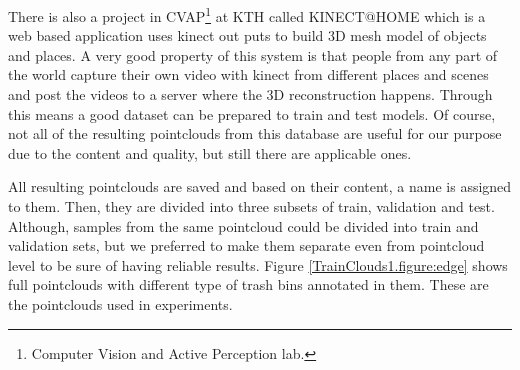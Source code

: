 There is also a project in CVAP\footnote{Computer Vision and Active Perception lab.} at KTH called KINECT@HOME \cite{aydemir2012kinect} which is a web based application uses
kinect out puts to build 3D mesh model of objects and places. 
A very good property of this system is that people from any part of the world capture their own video with kinect from different 
places and scenes and post the videos to a server where the 3D reconstruction happens. 
Through this means a good dataset can be prepared to train and test models.
Of course, not all of the resulting pointclouds from this database are useful for our purpose due to the content and
quality, but still there are applicable ones.


All resulting pointclouds are saved and based on their content, a name is assigned to them. 
Then, they are divided into three subsets of train, validation and test. 
Although, samples from the same pointcloud could be divided into train and validation sets, but we preferred to make them 
separate even from pointcloud level to be sure of having reliable results. 
Figure \ref{TrainClouds1.figure:edge} shows full pointclouds with different type of trash bins annotated in them. 
These are the pointclouds used in experiments.



